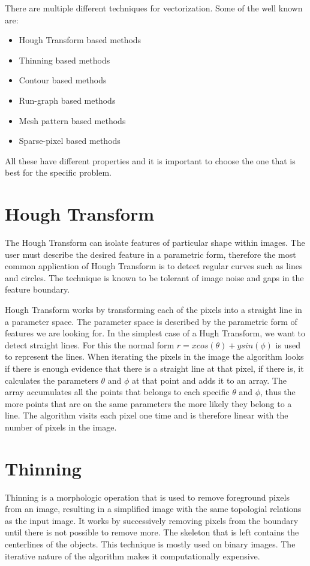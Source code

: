 There are multiple different techniques for vectorization. Some of the well known are:

\begin{itemize}
	\item Hough Transform based methods
	\item Thinning based methods
	\item Contour based methods
	\item Run-graph based methods
	\item Mesh pattern based methods
	\item Sparse-pixel based methods
\end{itemize}

All these have different properties and it is important to choose the one that is best for the specific problem. 

\section{Hough Transform}
The Hough Transform can isolate features of particular shape within images. The user must describe the desired feature in a parametric form, therefore the most common application of Hough Transform is to detect regular curves such as lines and circles. The technique is known to be tolerant of image noise and gaps in the feature boundary.

Hough Transform works by transforming each of the pixels into a straight line in a parameter space. The parameter space is described by the parametric form of features we are looking for. In the simplest case of a Hugh Transform, we want to detect straight lines. For this the normal form $r = x cos(\theta) + y sin(\phi)$ is used to represent the lines. When iterating the pixels in the image the algorithm looks if there is enough evidence that there is a straight line at that pixel, if there is, it calculates the parameters $\theta$ and $\phi$ at that point and adds it to an array. The array accumulates all the points that belongs to each specific $\theta$ and $\phi$, thus the more points that are on the same parameters the more likely they belong to a line. The algorithm visits each pixel one time and is therefore linear with the number of pixels in the image.

\section{Thinning}
Thinning is a morphologic operation that is used to remove foreground pixels from an image, resulting in a simplified image with the same topologial relations as the input image. It works by successively removing pixels from the boundary until there is not possible to remove more. The skeleton that is left contains the centerlines of the objects. This technique is mostly used on binary images. The iterative nature of the algorithm makes it computationally expensive.

